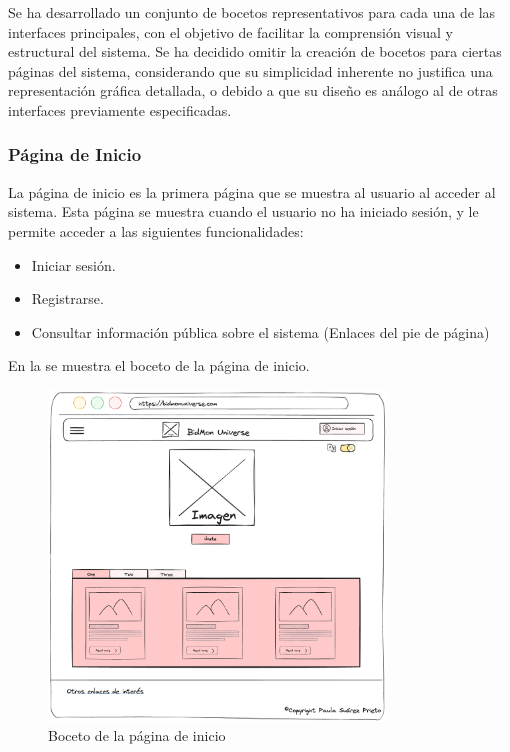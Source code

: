 Se ha desarrollado un conjunto de bocetos representativos para cada una de las interfaces principales, con el objetivo de facilitar la comprensión visual y estructural del sistema. 
Se ha decidido omitir la creación de bocetos para ciertas páginas del sistema, considerando que su simplicidad inherente no justifica una representación gráfica detallada, 
o debido a que su diseño es análogo al de otras interfaces previamente especificadas. 

\subsubsection{Página de Inicio}
La página de inicio es la primera página que se muestra al usuario al acceder al sistema.
Esta página se muestra cuando el usuario no ha iniciado sesión, y le permite acceder a las siguientes funcionalidades:
\begin{itemize}
    \item Iniciar sesión.
    \item Registrarse.
    \item Consultar información pública sobre el sistema (Enlaces del pie de página)
\end{itemize}

En la  se muestra el boceto de la página de inicio.

\begin{figure}[H]
    \centering
    \includegraphics[width=0.8\textwidth]{figures/6-Analisis/6-Interfaz/prototipos/home.png}
    \caption{Boceto de la página de inicio}
    \label{fig:p_home}
    \hypertarget{fig:p_home}{}
\end{figure}

